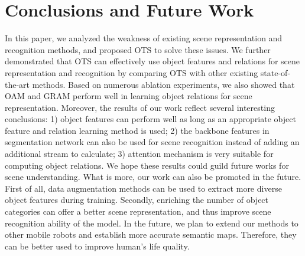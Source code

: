 \documentclass[letterpaper, 10 pt, conference]{ieeeconf}  %
\begin{document}
\section{Conclusions and Future Work}
\label{Conclusions and Future Work}

In this paper, we analyzed the weakness of existing scene representation and recognition methods, and proposed OTS to solve these issues. We further demonstrated that OTS can effectively use object features and relations for scene representation and recognition by comparing OTS with other existing state-of-the-art methods. Based on numerous ablation experiments, we also showed that OAM and GRAM perform well in learning object relations for scene representation. Moreover, the results of our work reflect several interesting conclusions: 1) object features can perform well as long as an appropriate object feature and relation learning method is used; 2) the backbone features in segmentation network can also be used for scene recognition instead of adding an additional stream to calculate; 3) attention mechanism is very suitable for computing object relations. We hope these results could guild future works for scene understanding. What is more, our work can also be promoted in the future. First of all, data augmentation methods can be used to extract more diverse object features during training. Secondly, enriching the number of object categories can offer a better scene representation, and thus improve scene recognition ability of the model. In the future, we plan to extend our methods to other mobile robots and establish more accurate semantic maps. Therefore, they can be better used to improve human's life quality.







%
%
\end{document}
